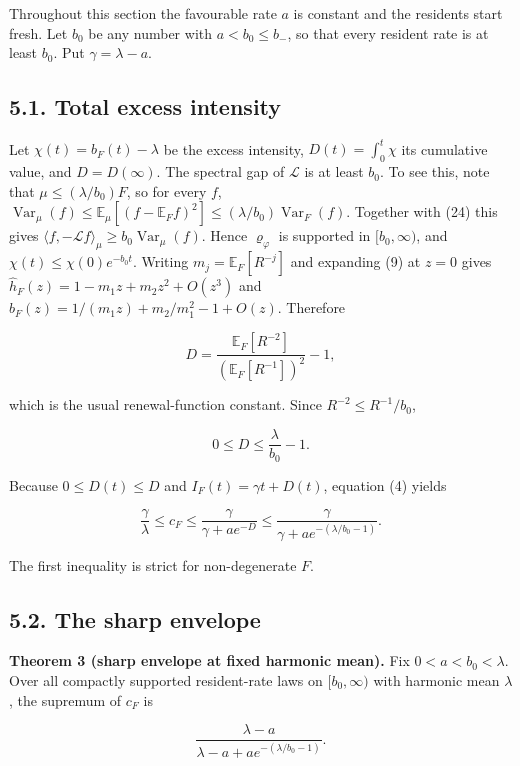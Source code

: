 \documentclass[
  british,
  11pt,
  a4paper,
]{article}
\begin{document}
Throughout this section the favourable rate \(a\) is constant and the
residents start fresh. Let \(b_0\) be any number with \(a<b_0\le b_-\),
so that every resident rate is at least \(b_0\). Put
\(\gamma=\lambda-a\).

\subsection{5.1. Total excess intensity}\label{total-excess-intensity}

Let \(\chi(t)=b_F(t)-\lambda\) be the excess intensity,
\(D(t)=\int_0^t\chi\) its cumulative value, and \(D=D(\infty)\). The
spectral gap of \(\mathcal L\) is at least \(b_0\). To see this, note
that \(\mu\le(\lambda/b_0)F\), so for every \(f\),
\(\operatorname{Var}_\mu(f)\le\mathbb E_\mu[(f-\mathbb E_Ff)^2]\le(\lambda/b_0)\operatorname{Var}_F(f)\).
Together with (24) this gives
\(\langle f,-\mathcal Lf\rangle_\mu\ge b_0\operatorname{Var}_\mu(f)\).
Hence \(\varrho_\varphi\) is supported in \([b_0,\infty)\), and
\(\chi(t)\le\chi(0)e^{-b_0t}\). Writing \(m_j=\mathbb E_F[R^{-j}]\) and
expanding (9) at \(z=0\) gives \(\widehat h_F(z)=1-m_1z+m_2z^2+O(z^3)\)
and \(\widehat b_F(z)=1/(m_1z)+m_2/m_1^2-1+O(z)\). Therefore

\[
D=\frac{\mathbb E_F[R^{-2}]}{(\mathbb E_F[R^{-1}])^2}-1,
\tag{35}
\]

which is the usual renewal-function constant. Since
\(R^{-2}\le R^{-1}/b_0\),

\[
0\le D\le\frac\lambda{b_0}-1.
\tag{36}
\]

Because \(0\le D(t)\le D\) and \(I_F(t)=\gamma t+D(t)\), equation (4)
yields

\[
\frac\gamma\lambda\le c_F\le\frac\gamma{\gamma+ae^{-D}}\le\frac\gamma{\gamma+ae^{-(\lambda/b_0-1)}}.
\tag{37}
\]

The first inequality is strict for non-degenerate \(F\).

\subsection{5.2. The sharp envelope}\label{the-sharp-envelope}

\textbf{Theorem 3 (sharp envelope at fixed harmonic mean).} Fix
\(0<a<b_0<\lambda\). Over all compactly supported resident-rate laws on
\([b_0,\infty)\) with harmonic mean \(\lambda\), the supremum of \(c_F\)
is

\[
\frac{\lambda-a}{\lambda-a+ae^{-(\lambda/b_0-1)}}.
\tag{38}
\]
\end{document}
